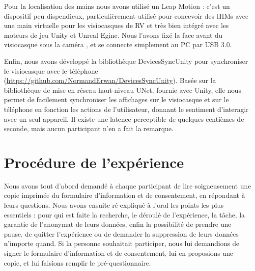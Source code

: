 
Pour la localisation des mains nous avons utilisé un Leap Motion : c'est un dispositif peu dispendieux, particulièrement utilisé pour concevoir des IHMs avec une main virtuelle pour les visiocasques de RV et très bien intégré avec les moteurs de jeu Unity et Unreal Egine. Nous l'avons fixé la face avant du visiocasque sous la caméra , et se connecte simplement au PC par USB 3.0.

Enfin, nous avons développé la bibliothèque DevicesSyncUnity pour synchroniser le visiocasque avec le téléphone (\url{https://github.com/NormandErwan/DevicesSyncUnity}). Basée sur la bibliothèque de mise en réseau haut-niveau UNet, fournie avec Unity, elle nous permet de facilement synchroniser les affichages sur le visiocasque et sur le téléphone en fonction les actions de l'utilisateur, donnant le sentiment d'interagir avec un seul appareil. Il existe une latence perceptible de quelques centièmes de seconde, mais aucun participant n'en a fait la remarque.


\section{Procédure de l'expérience}
\label{sec:experiment_procedure}

Nous avons tout d'abord demandé à chaque participant de lire soigneusement une copie imprimée du formulaire d'information et de consentement, en répondant à leurs questions. Nous avons ensuite ré-expliqué à l'oral les points les plus essentiels : pour qui est faite la recherche, le déroulé de l'expérience, la tâche, la garantie de l'anonymat de leurs données, enfin la possibilité de prendre une pause, de quitter l'expérience ou de demander la suppression de leurs données n'importe quand. Si la personne souhaitait participer, nous lui demandions de signer le formulaire d'information et de consentement, lui en proposions une copie, et lui faisions remplir le pré-questionnaire.

